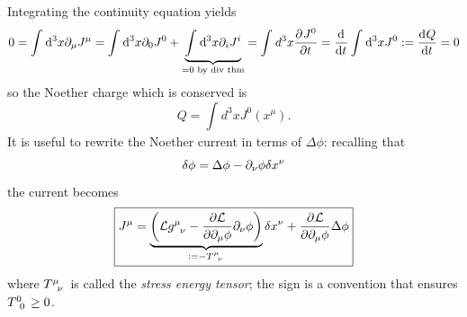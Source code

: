 Integrating the continuity equation yields
$$0=\int_{}^{}\dd^3x \partial_\mu J^\mu = \int_{}^{}\dd^3x \partial_0J^0+
\underbrace{\int_{}^{}\dd^3x\partial_i J^i}_{=0\text{ by div thm}}=
\int_{}^{}d^3x\pdv[]{J^0}{t} = \dv[]{}{t}\int_{}^{}\dd^3xJ^0:=\dv[]{Q}{t}=0$$
so the Noether charge which is conserved is
$$\boxed{Q = \int_{}^{}d^3xJ^0(x^\mu).}$$
It is useful to rewrite the Noether current in terms of $\Delta\phi$:
recalling that
$$\delta\phi = \Delta\phi - \partial_\nu\phi\delta x^\nu$$
the current becomes
$$\boxed{J^\mu = \underbrace{\left(\mathcal{L}g\indices{^\mu_\nu}-
\pdv{\mathcal{L}}{\pd_\mu\phi}\pd_\nu\phi\right)}_{:=-T\indices{^\mu_\nu}}
\delta x^\nu +\pdv[]{\mathcal{L}}{\pd_\mu\phi}\Delta\phi}$$
where $T\indices{^\mu_\nu}$ is called the \textit{stress energy tensor}; the sign
is a convention that ensures $T\indices{^0_0}\geq0$.

